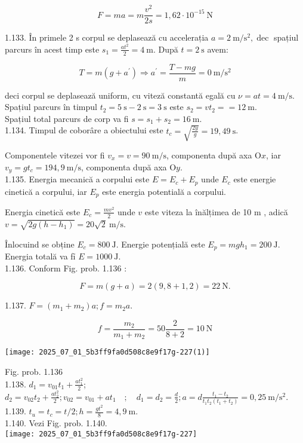 $$
F=m a=m \frac{v^{2}}{2 s}=1,62 \cdot 10^{-15} \mathrm{~N}
$$

1.133. În primele 2 s corpul se deplasează cu accelerația $a=2 \mathrm{~m} / \mathrm{s}^{2}, \operatorname{dec}$ spațiul parcurs în acest timp este $s_{1}=\frac{a t^{2}}{2}=4 \mathrm{~m}$. După $t=2 \mathrm{~s}$ avem:

$$
T=m\left(g+a^{\prime}\right) \Rightarrow a^{\prime}=\frac{T-m g}{m}=0 \mathrm{~m} / \mathrm{s}^{2}
$$

deci corpul se deplasează uniform, cu viteză constantă egală cu $\nu=a t=4 \mathrm{~m} / \mathrm{s}$.\\
Spațiul parcurs în timpul $t_{2}=5 \mathrm{~s}-2 \mathrm{~s}=3 \mathrm{~s}$ este $s_{2}=v t_{2}==12 \mathrm{~m}$.\\
Spațiul total parcurs de corp va fi $s=s_{1}+s_{2}=16 \mathrm{~m}$.\\
1.134. Timpul de coborâre a obiectului este $t_{c}=\sqrt{\frac{2 y}{g}}=19,49 \mathrm{~s}$.

Componentele vitezei vor fi $v_{x}=v=90 \mathrm{~m} / \mathrm{s}$, componenta după axa $\mathrm{O} x$, iar $v_{y}=g t_{c}=194,9 \mathrm{~m} / \mathrm{s}$, componenta după axa $\mathrm{O} y$.\\
1.135. Energia mecanică a corpului este $E=E_{c}+E_{p}$ unde $E_{c}$ este energie cinetică a corpului, iar $E_{p}$ este energia potentială a corpului.

Energia cinetică este $E_{c}=\frac{m v^{2}}{2}$ unde $v$ este viteza la înălțimea de 10 m , adică $v=\sqrt{2 g\left(h-h_{1}\right)}=20 \sqrt{2} \mathrm{~m} / \mathrm{s}$.

Înlocuind se obține $E_{c}=800 \mathrm{~J}$. Energie potențială este $E_{p}=m g h_{1}=200 \mathrm{~J}$.\\
Energia totală va fỉ $E=1000 \mathrm{~J}$.\\
1.136. Conform Fig. prob. 1.136 :

$$
F=m(g+a)=2(9,8+1,2)=22 \mathrm{~N} .
$$

1.137. $F=\left(m_{1}+m_{2}\right) a ; f=m_{2} a$.

$$
f=\frac{m_{2}}{m_{1}+m_{2}}=50 \frac{2}{8+2}=10 \mathrm{~N}
$$

\begin{center}
\texttt{[image: 2025\_07\_01\_5b3ff9fa0d508c8e9f17g-227(1)]}
\end{center}

Fig. prob. 1.136\\
1.138. $d_{1}=v_{01} t_{1}+\frac{a t_{1}^{2}}{2}$; $d_{2}=v_{02} t_{2}+\frac{a t_{2}^{2}}{2} ; v_{02}=v_{01}+a t_{1} \quad ; \quad d_{1}=d_{2}=\frac{d}{2} ; a=d \frac{t_{1}-t_{2}}{t_{1} t_{2}\left(t_{1}+t_{2}\right)}=0,25 \mathrm{~m} / \mathrm{s}^{2}$.\\
1.139. $t_{u}=t_{c}=t / 2 ; h=\frac{g t^{2}}{8}=4,9 \mathrm{~m}$.\\
1.140. Vezi Fig. prob. 1.140.\\
\texttt{[image: 2025\_07\_01\_5b3ff9fa0d508c8e9f17g-227]}

